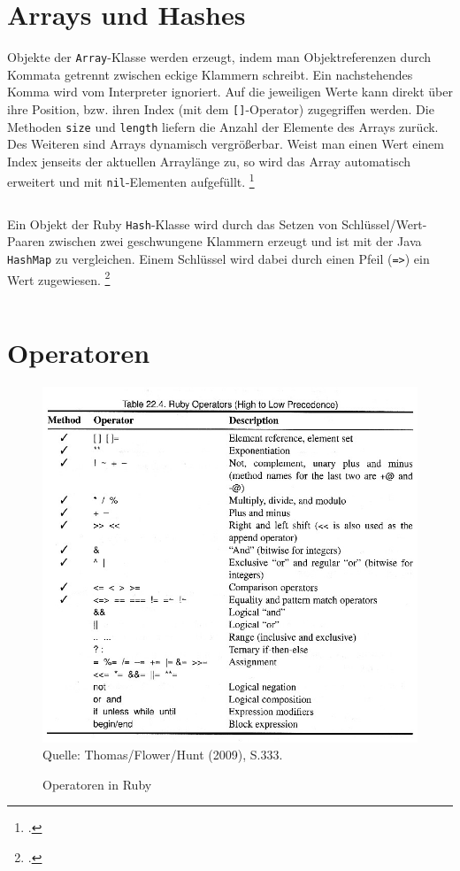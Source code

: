 \documentclass[a4paper, 11pt]{scrreprt}
\begin{document}
\section{Arrays und Hashes}
Objekte der \texttt{Array}-Klasse werden erzeugt, indem man Objektreferenzen durch Kommata getrennt zwischen eckige Klammern schreibt. Ein nachstehendes Komma wird vom Interpreter ignoriert. Auf die jeweiligen Werte kann direkt über ihre Position, bzw. ihren Index (mit dem \texttt{[]}-Operator) zugegriffen werden. Die Methoden \texttt{size} und \texttt{length} liefern die Anzahl der Elemente des Arrays zurück. Des Weiteren sind Arrays dynamisch vergrößerbar. Weist man einen Wert einem Index jenseits der aktuellen Arraylänge zu, so wird das Array automatisch erweitert und mit \texttt{nil}-Elementen aufgefüllt. 
\footcite[vgl.][S.318]{p_ruby}
\inputminted[]{ruby}{arrays.rb}
Ein Objekt der Ruby \texttt{Hash}-Klasse wird durch das Setzen von Schlüssel/Wert-Paaren zwischen zwei geschwungene Klammern erzeugt und ist mit der Java \texttt{HashMap} zu vergleichen. Einem Schlüssel wird dabei durch einen Pfeil (\texttt{=>}) ein Wert zugewiesen.
\footcite[vgl.][S.318-319]{p_ruby}
\inputminted[]{ruby}{hashes.rb}


\section{Operatoren}
\begin{figure}[h]
\centering
\caption[Operatoren in Ruby]{Operatoren in Ruby}
\includegraphics[width=425px]{operators.jpg}\\
Quelle: Thomas/Flower/Hunt (2009), S.333.
\end{figure}
\end{document}
